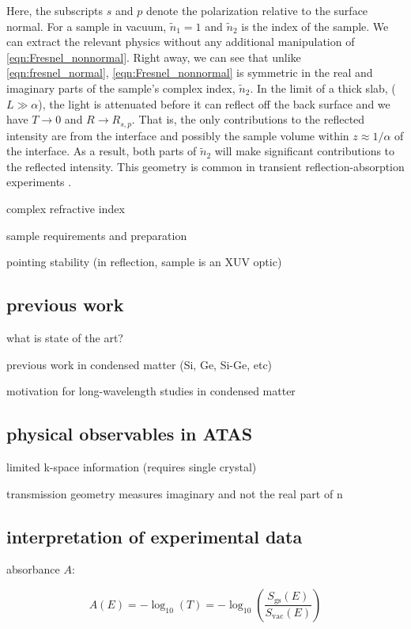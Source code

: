 Here, the subscripts $s$ and $p$ denote the polarization relative to the surface normal. For a sample in vacuum, $\tilde{n}_1=1$ and $\tilde{n}_2$ is the index of the sample. We can extract the relevant physics without any additional manipulation of \cref{eqn:Fresnel_nonnormal}. Right away, we can see that unlike \cref{eqn:fresnel_normal}, \cref{eqn:Fresnel_nonnormal} is symmetric in the real and imaginary parts of the sample's complex index, $\tilde{n}_2$. In the limit of a thick slab, ($L \gg \alpha$), the light is attenuated before it can reflect off the back surface and we have $T \rightarrow 0$ and $R \rightarrow R_{s,p}$. That is, the only contributions to the reflected intensity are from the interface and possibly the sample volume within $z \approx 1/\alpha$ of the interface. As a result, both parts of $\tilde{n}_2$ will make significant contributions to the reflected intensity. This geometry is common in transient reflection-absorption experiments \cite{cirriAchievingSurfaceSensitivity2017,kaplanFemtosecondTrackingCarrier2018}.



complex refractive index

sample requirements and preparation

pointing stability (in reflection, sample is an XUV optic)

\subsection{previous work}
what is state of the art?

previous work in condensed matter (Si, Ge, Si-Ge, etc)

motivation for long-wavelength studies in condensed matter

\subsection{physical observables in ATAS}
limited k-space information (requires single crystal)

transmission geometry measures imaginary and not the real part of n

\subsection{interpretation of experimental data}

absorbance $A$:

\begin{equation}
A(E) = - \log_{10} (T) = -\log_{10} \left( \frac{S_{\textrm{gs}}(E)}{ S_{\textrm{vac}} (E)} \right)
\label{eqn:absorbance}
\end{equation}

